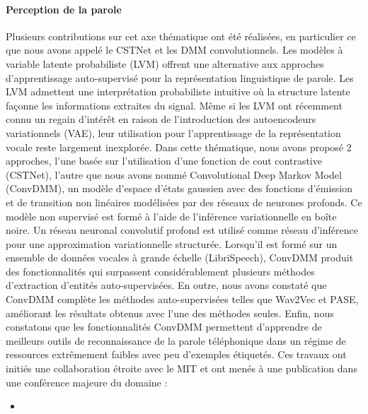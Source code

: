 \documentclass[11pt,a4paper]{article}
\begin{document}
\paragraph{Perception de la parole}  Plusieurs contributions sur cet axe thématique ont été réalisées, en particulier ce que nous avons appelé le CSTNet et les DMM convolutionnels. Les modèles à variable latente probabiliste (LVM) offrent une alternative aux approches d'apprentissage auto-supervisé pour la représentation linguistique de parole. Les LVM admettent une interprétation probabiliste intuitive où la structure latente façonne les informations extraites du signal. Même si les LVM ont récemment connu un regain d'intérêt en raison de l'introduction des autoencodeurs variationnels (VAE), leur utilisation pour l'apprentissage de la représentation vocale reste largement inexplorée. Dans cette thématique, nous avons proposé 2 approches, l'une basée sur l'utilisation d'une fonction de cout contrastive (CSTNet), l'autre que nous avons nommé Convolutional Deep Markov Model (ConvDMM), un modèle d'espace d'états gaussien avec des fonctions d'émission et de transition non linéaires modélisées par des réseaux de neurones profonds. Ce modèle non supervisé est formé à l'aide de l'inférence variationnelle en boîte noire. Un réseau neuronal convolutif profond est utilisé comme réseau d'inférence pour une approximation variationnelle structurée. Lorsqu'il est formé sur un ensemble de données vocales à grande échelle (LibriSpeech), ConvDMM produit des fonctionnalités qui surpassent considérablement plusieurs méthodes d'extraction d'entités auto-supervisées. En outre, nous avons constaté que ConvDMM complète les méthodes auto-supervisées telles que Wav2Vec et PASE, améliorant les résultats obtenus avec l'une des méthodes seules. Enfin, nous constatons que les fonctionnalités ConvDMM permettent d'apprendre de meilleurs outils de reconnaissance de la parole téléphonique dans un régime de ressources extrêmement faibles avec peu d'exemples étiquetés.
Ces travaux ont initiés une collaboration étroite avec le MIT et ont menés à une publication dans une conférence majeure du domaine :

\begin{itemize}
 \item {} 
\end{itemize}
\end{document}
